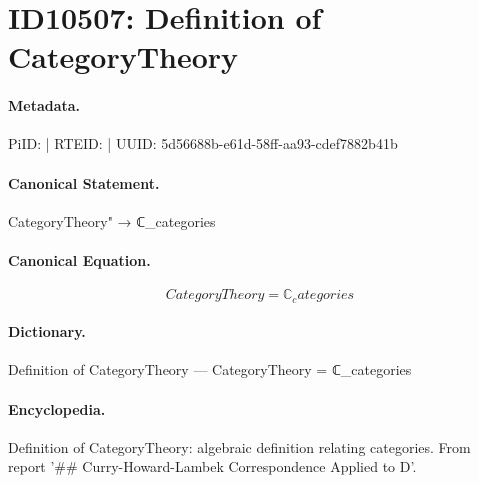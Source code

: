 \section*{ID10507: Definition of CategoryTheory}
\paragraph{Metadata.}
PiID:  | RTEID:  | UUID: 5d56688b-e61d-58ff-aa93-cdef7882b41b

\paragraph{Canonical Statement.}
CategoryTheory" → ℂ\_categories

\paragraph{Canonical Equation.}
\[
CategoryTheory = ℂ_categories
\]

\paragraph{Dictionary.}
Definition of CategoryTheory — CategoryTheory = ℂ\_categories

\paragraph{Encyclopedia.}
Definition of CategoryTheory: algebraic definition relating categories. From report '\#\# Curry-Howard-Lambek Correspondence Applied to D'.
